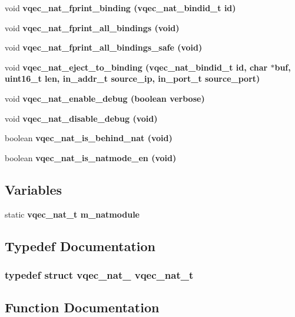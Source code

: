 \begin{CompactItemize}
\item 
void \bf{vqec\_\-nat\_\-fprint\_\-binding} (vqec\_\-nat\_\-bindid\_\-t id)
\item 
void \bf{vqec\_\-nat\_\-fprint\_\-all\_\-bindings} (void)
\item 
void \bf{vqec\_\-nat\_\-fprint\_\-all\_\-bindings\_\-safe} (void)
\item 
void \bf{vqec\_\-nat\_\-eject\_\-to\_\-binding} (vqec\_\-nat\_\-bindid\_\-t id, char $\ast$buf, uint16\_\-t len, in\_\-addr\_\-t source\_\-ip, in\_\-port\_\-t source\_\-port)
\item 
void \bf{vqec\_\-nat\_\-enable\_\-debug} (boolean verbose)
\item 
void \bf{vqec\_\-nat\_\-disable\_\-debug} (void)
\item 
boolean \bf{vqec\_\-nat\_\-is\_\-behind\_\-nat} (void)
\item 
boolean \bf{vqec\_\-nat\_\-is\_\-natmode\_\-en} (void)
\end{CompactItemize}
\subsection*{Variables}
\begin{CompactItemize}
\item 
static \bf{vqec\_\-nat\_\-t} \bf{m\_\-natmodule}
\end{CompactItemize}


\subsection{Typedef Documentation}
\subsubsection{\setlength{\rightskip}{0pt plus 5cm}typedef struct \bf{vqec\_\-nat\_\-}  \bf{vqec\_\-nat\_\-t}}\label{vqec__nat__api_8c_97622474f7a948edb7da37161173b78e}




\subsection{Function Documentation}
